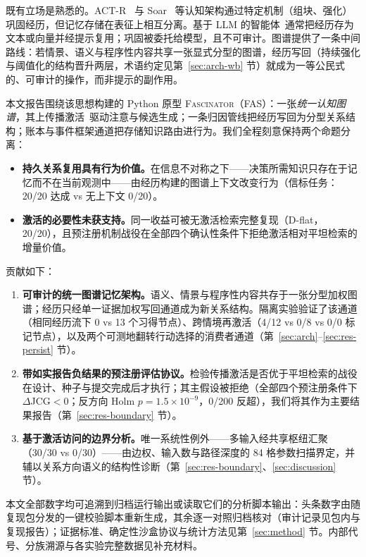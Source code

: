 \documentclass[10pt,a4paper]{ctexart}
\begin{document}
既有立场是熟悉的。ACT-R~\citep{anderson2004integrated} 与 Soar~\citep{laird2012soar} 等认知架构通过特定机制（组块、强化）巩固经历，但记忆存储在表征上相互分离。基于 LLM 的智能体~\citep{yao2023react,park2023generative,shinn2023reflexion}通常把经历存为文本或向量并经提示复用；巩固被委托给模型，且不可审计。图谱提供了一条中间路线：若情景、语义与程序性内容共享一张显式分型的图谱，经历写回（持续强化与阈值化的结构晋升两层，术语约定见第~\ref{sec:arch-wb} 节）就成为一等公民式的、可审计的操作，而非提示的副作用。

本文报告围绕该思想构建的 Python 原型 \textsc{Fascinator}（FAS）：一张\emph{统一认知图谱}，其上传播激活~\citep{collins1975spreading}驱动注意与候选生成；一条归因管线把经历写回为分型关系结构；账本与事件框架通道把存储知识路由进行为。我们全程刻意保持两个命题分离：

\begin{itemize}
\item[(a)] \textbf{持久关系复用具有行为价值。}在信息不对称之下——决策所需知识只存在于记忆而不在当前观测中——由经历构建的图谱上下文改变行为（信标任务：20/20 达成 vs 无上下文 0/20）。
\item[(b)] \textbf{激活的必要性未获支持。}同一收益可被无激活检索完整复现（D-flat，20/20），且预注册机制战役在全部四个确认性条件下拒绝激活相对平坦检索的增量价值。
\end{itemize}

贡献如下：
\begin{enumerate}
\item \textbf{可审计的统一图谱记忆架构。}语义、情景与程序性内容共存于一张分型加权图谱；经历只经单一证据加权写回通道成为新关系结构。隔离实验验证了该通道（相同经历流下 0 vs 13 个习得节点）、跨情境再激活（4/12 vs 0/8 vs 0/0 标记节点），以及两个可测地翻转行动选择的消费者通道（第~\ref{sec:arch}--\ref{sec:res-persist} 节）。
\item \textbf{带如实报告负结果的预注册评估协议。}检验传播激活是否优于平坦检索的战役在设计、种子与提交完成后才执行；其主假设被拒绝（全部四个预注册条件下 $\Delta$JCG${<}0$；反方向 Holm $p{=}1.5\times10^{-9}$，0/200 反超），我们将其作为主要结果报告（第~\ref{sec:res-boundary} 节）。
\item \textbf{基于激活访问的边界分析。}唯一系统性例外——多输入经共享枢纽汇聚（30/30 vs 0/30）——由边权、输入数与路径深度的 84 格参数扫描界定，并辅以关系方向语义的结构性诊断（第~\ref{sec:res-boundary}、\ref{sec:discussion} 节）。
\end{enumerate}

本文全部数字均可追溯到归档运行输出或读取它们的分析脚本输出：头条数字由随复现包分发的一键校验脚本重新生成，其余逐一对照归档核对（审计记录见包内与复现报告）；证据标准、确定性沙盒协议与统计方法见第~\ref{sec:method} 节。内部代号、分族溯源与各实验完整数据见补充材料。
\end{document}
